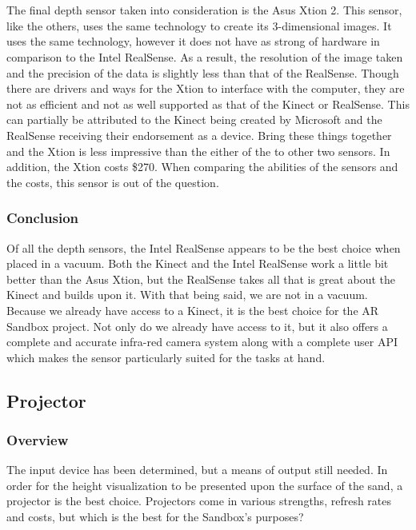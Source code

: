 \\\\
The final depth sensor taken into consideration is the Asus Xtion 2.
This sensor, like the others, uses the same technology to create its 3-dimensional images.
It uses the same technology, however it does not have as strong of hardware in comparison to the Intel RealSense.
As a result, the resolution of the image taken and the precision of the data is slightly less than that of the RealSense.
Though there are drivers and ways for the Xtion to interface with the computer, they are not as efficient and not as well supported as that of the Kinect or RealSense.
This can partially be attributed to the Kinect being created by Microsoft and the RealSense receiving their endorsement as a device.
Bring these things together and the Xtion is less impressive than the either of the to other two sensors.
In addition, the Xtion costs \$270.
When comparing the abilities of the sensors and the costs, this sensor is out of the question.


\subsubsection{Conclusion}
Of all the depth sensors, the Intel RealSense appears to be the best choice when placed in a vacuum.
Both the Kinect and the Intel RealSense work a little bit better than the Asus Xtion, but the RealSense takes all that is great about the Kinect and builds upon it.
With that being said, we are not in a vacuum.
Because we already have access to a Kinect, it is the best choice for the AR Sandbox project.
Not only do we already have access to it, but it also offers a complete and accurate infra-red camera system along with a complete user API which makes the sensor particularly suited for the tasks at hand.

\subsection{Projector}
\subsubsection{Overview}
The input device has been determined, but a means of output still needed.
In order for the height visualization to be presented upon the surface of the sand, a projector is the best choice.
Projectors come in various strengths, refresh rates and costs, but which is the best for the Sandbox's purposes?

